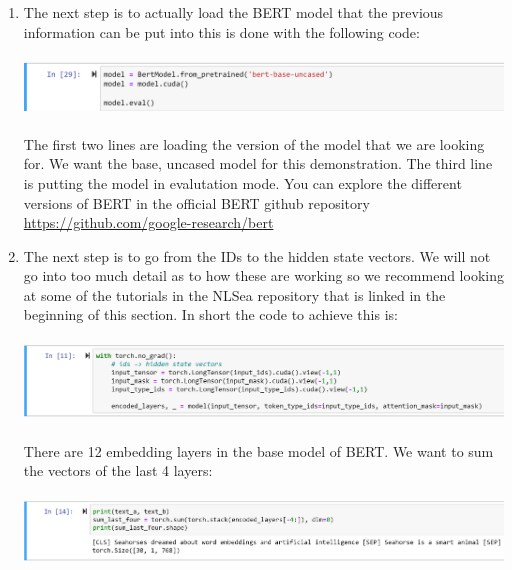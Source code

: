 \documentclass{article}
\begin{document}
\begin{enumerate}
    \item The next step is to actually load the BERT model that the previous information can be put into this is done with the following code:\\
    \vspace{.1cm}\\
    \includegraphics[scale = .7]{model_load.png}\\
    \vspace{.1cm}\\
    The first two lines are loading the version of the model that we are looking for.  We want the base, uncased model for this demonstration.  The third line is putting the model in evalutation mode.  You can explore the different versions of BERT in the official BERT github repository \url{https://github.com/google-research/bert}
    \vspace{.2cm}\\
    \item The next step is to go from the IDs to the hidden state vectors.  We will not go into too much detail as to how these are working so we recommend looking at some of the tutorials in the NLSea repository that is linked in the beginning of this section. In short the code to achieve this is:\\
    \vspace{.1cm}\\
    \includegraphics[scale = .7]{hidden.png}\\
    \vspace{.1cm}\\
    There are 12 embedding layers in the base model of BERT. We want to sum the vectors of the last 4 layers:\\
    \vspace{.1cm}\\
    \includegraphics[scale = .67]{sum4.png}\\

\end{enumerate}
\end{document}
